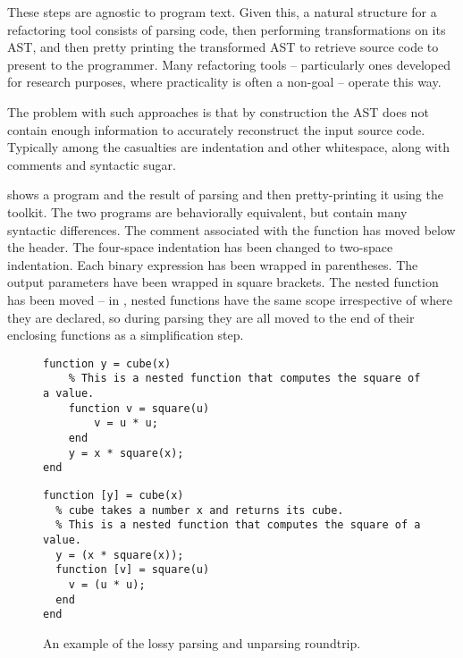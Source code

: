 These steps are agnostic to program text. Given this, a natural structure for a
refactoring tool consists of parsing code, then performing transformations on
its AST, and then pretty printing the transformed AST to retrieve source code
to present to the programmer. Many refactoring tools -- particularly ones
developed for research purposes, where practicality is often a non-goal --
operate this way.

The problem with such approaches is that by construction the AST does not
contain enough information to accurately reconstruct the input source code.
Typically among the casualties are indentation and other whitespace, along
with comments and syntactic sugar.

 shows a \matlab program and the result of parsing and
then pretty-printing it using the \mclab toolkit. The two programs are
behaviorally equivalent, but contain many syntactic differences. The comment
associated with the  function has moved below the header. The
four-space indentation has been changed to two-space indentation. Each binary
expression has been wrapped in parentheses. The output parameters have been
wrapped in square brackets. The nested function  has been moved
-- in \matlab, nested functions have the same scope irrespective of where they
are declared, so during parsing they are all moved to the end of their enclosing
functions as a simplification step.

\begin{figure}
\begin{minipage}{0.5\linewidth}
\begin{lstlisting}[numbers=none]
% cube takes a number x and returns its cube.
function y = cube(x)
    % This is a nested function that computes the square of a value.
    function v = square(u)
        v = u * u;
    end
    y = x * square(x);
end
\end{lstlisting}
\end{minipage}
\hfill \hspace{.3cm} \hfill
\begin{minipage}{0.5\linewidth}
\begin{lstlisting}[numbers=none]
function [y] = cube(x)
  % cube takes a number x and returns its cube.
  % This is a nested function that computes the square of a value.
  y = (x * square(x));
  function [v] = square(u)
    v = (u * u);
  end
end
\end{lstlisting}
\end{minipage}
\caption{An example of the lossy parsing and unparsing roundtrip.}
\label{Fig:LostLayout}
\end{figure}

